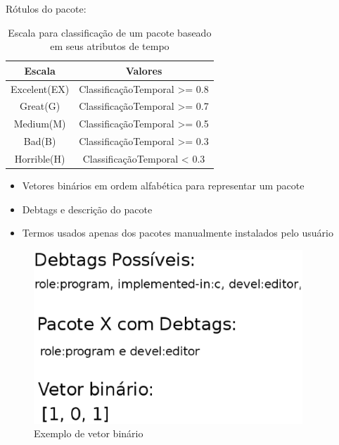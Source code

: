\begin{frame}

    Rótulos do pacote:
    \newline
    \newline

    \begin{table}[h]
    \centering
    \begin{tabular}{cc}
    \hline
    \rowcolor[HTML]{EFEFEF}
    {Escala} & {Valores} \\ \hline
    {Excelent(EX)}  & ClassificaçãoTemporal >= 0.8                  \\ \hline
    {Great(G)}   & ClassificaçãoTemporal >= 0.7                  \\ \hline
    {Medium(M)}   & ClassificaçãoTemporal >= 0.5                  \\ \hline
    {Bad(B)}   & ClassificaçãoTemporal >= 0.3                  \\ \hline
    {Horrible(H)}   &ClassificaçãoTemporal < 0.3                   \\ \hline
    \end{tabular}
    \caption{Escala para classificação de um pacote baseado em seus atributos de tempo}
    \label{tab:classificacao_pacotes}
    \end{table}

\end{frame}

\begin{frame}

    \begin{itemize}
        \item Vetores binários em ordem alfabética para representar um pacote
        \item Debtags e descrição do pacote
        \item Termos usados apenas dos pacotes manualmente instalados pelo
              usuário
    \end{itemize}
\end{frame}

\begin{frame}
 \begin{figure}[h]
  \centering
  \includegraphics[width=0.9\textwidth]{figura/vetor_binario.eps}
  \caption{Exemplo de vetor binário}
  \label{fig:curva_aprendizado}
 \end{figure}
\end{frame}

